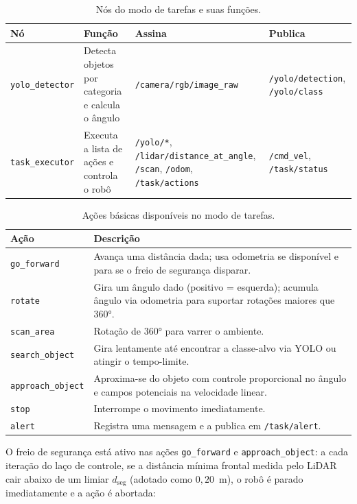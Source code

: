 \begin{table}[H]
\centering
\footnotesize
\caption{Nós do modo de tarefas e suas funções.}
\label{tab:nos_modo2}
\begin{tabular}{@{}l p{3.1cm} p{3.7cm} p{3.2cm}@{}}
\hline
\textbf{Nó} & \textbf{Função} & \textbf{Assina} & \textbf{Publica} \\ \hline
\texttt{yolo\_detector} & Detecta objetos por categoria e calcula o ângulo & \texttt{/camera/rgb/image\_raw} & \texttt{/yolo/detection}, \texttt{/yolo/class} \\[2pt]
\texttt{task\_executor} & Executa a lista de ações e controla o robô & \texttt{/yolo/*}, \texttt{/lidar/distance\_at\_angle}, \texttt{/scan}, \texttt{/odom}, \texttt{/task/actions} & \texttt{/cmd\_vel}, \texttt{/task/status} \\ \hline
\end{tabular}
\end{table}

\begin{table}[H]
\centering
\caption{Ações básicas disponíveis no modo de tarefas.}
\label{tab:acoes}
\begin{tabular}{lp{8.5cm}}
\hline
\textbf{Ação} & \textbf{Descrição} \\ \hline
\texttt{go\_forward} & Avança uma distância dada; usa odometria se disponível e para se o freio de segurança disparar. \\
\texttt{rotate} & Gira um ângulo dado (positivo = esquerda); acumula ângulo via odometria para suportar rotações maiores que 360°. \\
\texttt{scan\_area} & Rotação de 360° para varrer o ambiente. \\
\texttt{search\_object} & Gira lentamente até encontrar a classe-alvo via YOLO ou atingir o tempo-limite. \\
\texttt{approach\_object} & Aproxima-se do objeto com controle proporcional no ângulo e campos potenciais na velocidade linear. \\
\texttt{stop} & Interrompe o movimento imediatamente. \\
\texttt{alert} & Registra uma mensagem e a publica em \texttt{/task/alert}. \\ \hline
\end{tabular}
\end{table}

O freio de segurança está ativo nas ações \texttt{go\_forward} e
\texttt{approach\_object}: a cada iteração do laço de controle, se a distância
mínima frontal medida pelo LiDAR cair abaixo de um limiar $d_{\text{seg}}$
(adotado como $0{,}20$~m), o robô é parado imediatamente e a ação é abortada:

